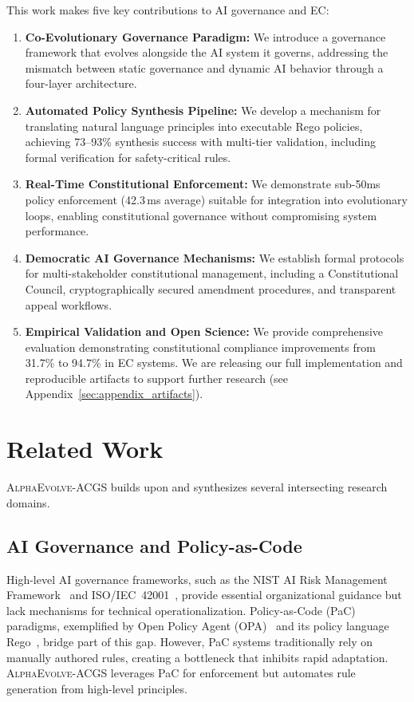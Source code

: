\documentclass[10pt,twocolumn]{article}
\newcommand{\acgs}{\textsc{AlphaEvolve-ACGS}}
\theoremstyle{definition}
\begin{document}
This work makes five key contributions to AI governance and EC:
\begin{enumerate}[leftmargin=*,topsep=2pt,itemsep=2pt,parsep=0pt]
    \item \textbf{Co-Evolutionary Governance Paradigm:} We introduce a governance framework that evolves alongside the AI system it governs, addressing the mismatch between static governance and dynamic AI behavior through a four-layer architecture.
    \item \textbf{Automated Policy Synthesis Pipeline:} We develop a mechanism for translating natural language principles into executable Rego policies, achieving 73--93\% synthesis success with multi-tier validation, including formal verification for safety-critical rules.
    \item \textbf{Real-Time Constitutional Enforcement:} We demonstrate sub-50ms policy enforcement (42.3\,ms average) suitable for integration into evolutionary loops, enabling constitutional governance without compromising system performance.
    \item \textbf{Democratic AI Governance Mechanisms:} We establish formal protocols for multi-stakeholder constitutional management, including a Constitutional Council, cryptographically secured amendment procedures, and transparent appeal workflows.
    \item \textbf{Empirical Validation and Open Science:} We provide comprehensive evaluation demonstrating constitutional compliance improvements from 31.7\% to 94.7\% in EC systems. We are releasing our full implementation and reproducible artifacts to support further research (see Appendix~\ref{sec:appendix_artifacts}).
\end{enumerate}

\section{Related Work}
\label{sec:related_work}
\acgs{} builds upon and synthesizes several intersecting research domains.

\subsection{AI Governance and Policy-as-Code}
High-level AI governance frameworks, such as the NIST AI Risk Management Framework~\cite{nist2023ai} and ISO/IEC~42001~\cite{iso42001}, provide essential organizational guidance but lack mechanisms for technical operationalization. Policy-as-Code (PaC) paradigms, exemplified by Open Policy Agent (OPA)~\cite{opa2023} and its policy language Rego~\cite{rego2019}, bridge part of this gap. However, PaC systems traditionally rely on manually authored rules, creating a bottleneck that inhibits rapid adaptation. \acgs{} leverages PaC for enforcement but automates rule generation from high-level principles.
\end{document}

